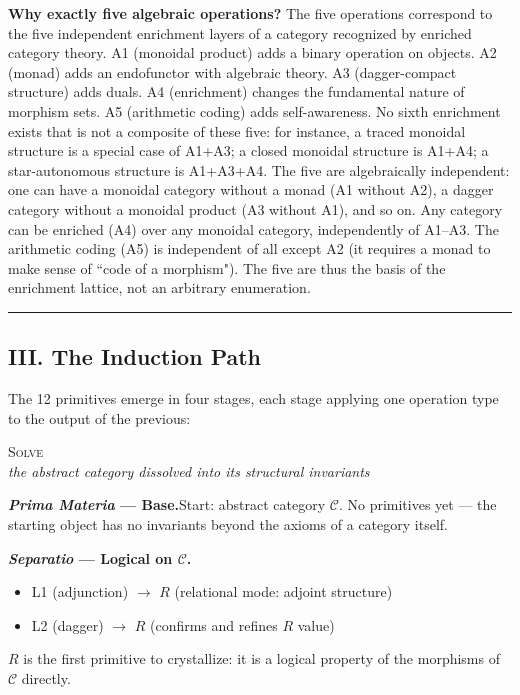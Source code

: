 \documentclass[12pt,a4paper]{article}
\begin{document}
\textbf{Why exactly five algebraic operations?} The five operations correspond to the five independent enrichment layers of a category recognized by enriched category theory. A1 (monoidal product) adds a binary operation on objects. A2 (monad) adds an endofunctor with algebraic theory. A3 (dagger-compact structure) adds duals. A4 (enrichment) changes the fundamental nature of morphism sets. A5 (arithmetic coding) adds self-awareness. No sixth enrichment exists that is not a composite of these five: for instance, a traced monoidal structure is a special case of A1+A3; a closed monoidal structure is A1+A4; a star-autonomous structure is A1+A3+A4. The five are algebraically independent: one can have a monoidal category without a monad (A1 without A2), a dagger category without a monoidal product (A3 without A1), and so on. Any category can be enriched (A4) over any monoidal category, independently of A1--A3. The arithmetic coding (A5) is independent of all except A2 (it requires a monad to make sense of ``code of a morphism"). The five are thus the basis of the enrichment lattice, not an arbitrary enumeration.

\begin{center}
\rule{0.5\textwidth}{0.4pt}
\end{center}

\subsection{III. The Induction Path}

The 12 primitives emerge in four stages, each stage applying one operation type to the output of the previous:

\begin{center}
\vspace{0.6em}
{\large\textsc{Solve}}\\[4pt]
{\small\itshape the abstract category dissolved into its structural invariants}
\vspace{0.4em}
\end{center}

\noindent\textbf{\emph{Prima Materia} --- Base.}\quad Start: abstract category $\mathcal{C}$. No primitives yet --- the starting object has no invariants beyond the axioms of a category itself.

\medskip
\noindent\textbf{\emph{Separatio} --- Logical on $\mathcal{C}$.}
\begin{itemize}[nosep, leftmargin=2em]
  \item L1 (adjunction) $\to$ $R$ (relational mode: adjoint structure)
  \item L2 (dagger) $\to$ $R$ (confirms and refines $R$ value)
\end{itemize}
$R$ is the first primitive to crystallize: it is a logical property of the morphisms of $\mathcal{C}$ directly.
\end{document}
